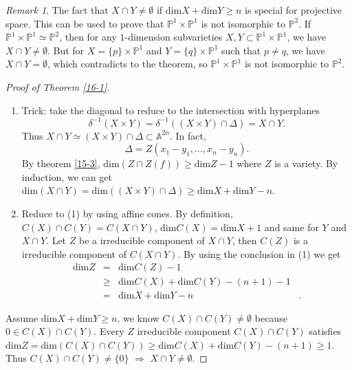 \documentclass{amsart}
\theoremstyle{plain}
\theoremstyle{definition}
\theoremstyle{remark}
\newtheorem*{remark}{Remark}
\numberwithin{equation}{section}
\begin{document}
\begin{remark}
	The fact that $ X\cap Y\neq \emptyset $ if $\text{dim}X+\text{dim}Y\geq n $ is special for projective space. This can be used to prove that $ \mathbb{P}^1\times\mathbb{P}^1 $ is not isomorphic to $ \mathbb{P}^2 $. If $ \mathbb{P}^1\times\mathbb{P}^1 \simeq \mathbb{P}^2$, then for any $ 1 $-dimension subvarieties $ X,Y \subset \mathbb{P}^1\times \mathbb{P}^1$, we have $ X\cap Y \neq \emptyset $. But for $ X=\lbrace p\rbrace\times \mathbb{P}^1$ and $ Y=\lbrace q\rbrace \times \mathbb{P}^1 $ such that $ p\neq q $, we have $ X\cap Y=\emptyset $, which contradicts to the theorem, so $ \mathbb{P}^1\times\mathbb{P}^1 $ is not isomorphic to $ \mathbb{P}^2 $.
\end{remark}
\begin{proof}[Proof of Theorem \ref{16-1}]
	\begin{enumerate}
		\item Trick: take the diagonal to reduce to the intersection with hyperplanes
		$$
		\delta^{-1}(X\times Y)=\delta^{-1}((X\times Y)\cap \Delta)=X\cap Y.
		$$
		Thus $ X\cap Y\simeq (X\times Y)\cap \Delta\subset \mathbb{A}^{2n} $. In fact, 
		$$
		\Delta =Z(x_1-y_1,\dots,x_n-y_n).
		$$
		By theorem \ref{15-3}, $ \text{dim}(Z\cap Z(f))\geq \text{dim}Z-1 $ where $ Z $ is a variety. By induction, we can get $ \text{dim}(X\cap Y)=\text{dim}((X\times Y)\cap \Delta)\geq \text{dim}X+\text{dim}Y-n $.
		\item Reduce to (1) by using affine cones. By definition, $ C(X)\cap C(Y)=C(X\cap Y) $, $ \text{dim}C(X)=\text{dim}X+1 $ and same for $ Y $ and $ X\cap Y $. Let $ Z $ be a irreducible component of $ X\cap Y $, then $ C(Z) $ is a irreducible component of $ C(X\cap Y) $.  By using the conclusion in (1) we get 
		$$
		\begin{array}{cccc}
		\text{dim}Z & = & \text{dim}C(Z)-1 & { }\\
		{ } &\geq & \text{dim}C(X)+\text{dim}C(Y)-(n+1)-1 & { }\\
		{ } & =  & \text{dim}X+\text{dim}Y-n & { }.
		\end{array}
		$$  
	\end{enumerate}
	Assume $ \text{dim}X+\text{dim}Y\geq n $, we know $ C(X)\cap C(Y)\neq \emptyset $ because $ 0\in C(X)\cap C(Y) $. Every $ Z $ irreducible component $ C(X)\cap C(Y) $ satisfies $ \text{dim}Z=\text{dim}(C(X)\cap C(Y))\geq \text{dim}C(X)+\text{dim}C(Y)-(n+1)\geq 1 $. Thus $ C(X)\cap C(Y)\neq \lbrace 0 \rbrace $ $ \Rightarrow $ $ X\cap Y\neq \emptyset $.
\end{proof}
\end{document}
